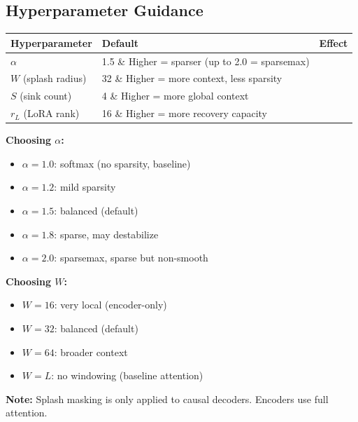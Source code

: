 \subsection{Hyperparameter Guidance}

\begin{table}[H]
\centering
\small
\begin{tabular}{lll}
\toprule
\textbf{Hyperparameter} & \textbf{Default} & \textbf{Effect} \\
\midrule
$\alpha$ & 1.5 \& Higher = sparser (up to 2.0 = sparsemax) \\
$W$ (splash radius) & 32 \& Higher = more context, less sparsity \\
$S$ (sink count) & 4 \& Higher = more global context \\
$r_L$ (LoRA rank) & 16 \& Higher = more recovery capacity \\
\bottomrule
\end{tabular}
\end{table}

\textbf{Choosing $\alpha$:}

\begin{itemize}
\item $\alpha = 1.0$: softmax (no sparsity, baseline)
\item $\alpha = 1.2$: mild sparsity
\item $\alpha = 1.5$: balanced (default)
\item $\alpha = 1.8$: sparse, may destabilize
\item $\alpha = 2.0$: sparsemax, sparse but non-smooth

\end{itemize}
\textbf{Choosing $W$:}

\begin{itemize}
\item $W = 16$: very local (encoder-only)
\item $W = 32$: balanced (default)
\item $W = 64$: broader context
\item $W = L$: no windowing (baseline attention)

\end{itemize}
\textbf{Note:} Splash masking is only applied to causal decoders. Encoders use 
full attention.